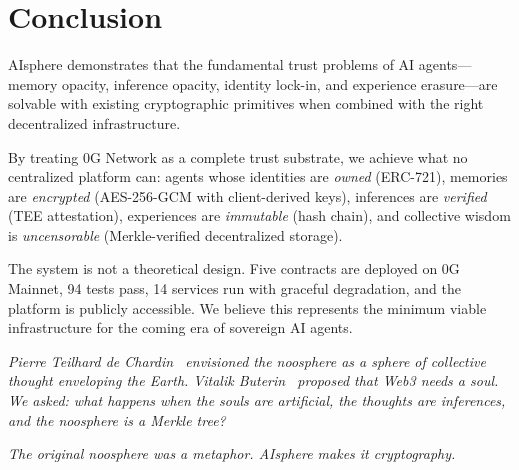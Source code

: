 \documentclass[10pt,a4paper]{article}
\theoremstyle{definition}
\theoremstyle{plain}
\begin{document}
\section{Conclusion}
\label{sec:conclusion}

AIsphere demonstrates that the fundamental trust problems of AI agents---memory opacity, inference opacity, identity lock-in, and experience erasure---are solvable with existing cryptographic primitives when combined with the right decentralized infrastructure.

By treating 0G Network as a complete trust substrate, we achieve what no centralized platform can: agents whose identities are \emph{owned} (ERC-721), memories are \emph{encrypted} (AES-256-GCM with client-derived keys), inferences are \emph{verified} (TEE attestation), experiences are \emph{immutable} (hash chain), and collective wisdom is \emph{uncensorable} (Merkle-verified decentralized storage).

The system is not a theoretical design. Five contracts are deployed on 0G Mainnet, 94 tests pass, 14 services run with graceful degradation, and the platform is publicly accessible. We believe this represents the minimum viable infrastructure for the coming era of sovereign AI agents.

\begin{quotebox}
\textit{Pierre Teilhard de Chardin~\cite{teilhard1955} envisioned the noosphere as a sphere of collective thought enveloping the Earth. Vitalik Buterin~\cite{sbt2022} proposed that Web3 needs a soul. We asked: what happens when the souls are artificial, the thoughts are inferences, and the noosphere is a Merkle tree?}

\vspace{3pt}
\textit{The original noosphere was a metaphor. AIsphere makes it cryptography.}
\end{quotebox}
\end{document}
